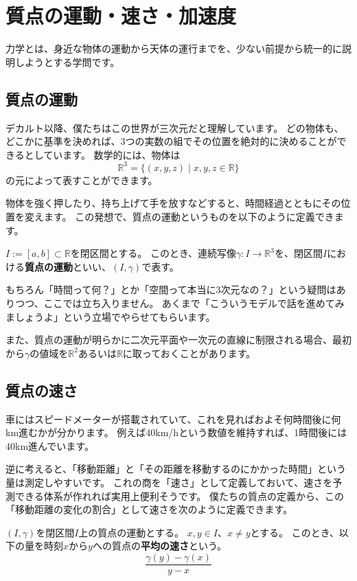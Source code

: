 \chapter{質点の運動・速さ・加速度}

力学とは、身近な物体の運動から天体の運行までを、少ない前提から統一的に説明しようとする学問です。

\section{質点の運動}

デカルト以降、僕たちはこの世界が三次元だと理解しています。
どの物体も、どこかに基準を決めれば、3つの実数の組でその位置を絶対的に決めることができるとしています。
数学的には、物体は
\[
  \mathbb{R}^3=\{(x,y,z)\mid x,y,z\in\mathbb{R}\}
\]
の元によって表すことができます。

物体を強く押したり、持ち上げて手を放すなどすると、時間経過とともにその位置を変えます。
この発想で、質点の運動というものを以下のように定義できます。
\begin{definition}
  $I:=[a,b]\subset\mathbb{R}$を閉区間とする。
  このとき、連続写像$\gamma:I\to\mathbb{R}^3$を、閉区間$I$における\textbf{質点の運動}といい、$(I,\gamma)$で表す。
\end{definition}

もちろん「時間って何？」とか「空間って本当に3次元なの？」という疑問はありつつ、ここでは立ち入りません。
あくまで「こういうモデルで話を進めてみましょうよ」という立場でやらせてもらいます。

また、質点の運動が明らかに二次元平面や一次元の直線に制限される場合、最初から$\gamma$の値域を$\mathbb{R}^2$あるいは$\mathbb{R}$に取っておくことがあります。



\section{質点の速さ}

車にはスピードメーターが搭載されていて、これを見ればおよそ何時間後に何km進むかが分かります。
例えば40km/hという数値を維持すれば、1時間後には40km進んでいます。

逆に考えると、「移動距離」と「その距離を移動するのにかかった時間」という量は測定しやすいです。
これの商を「速さ」として定義しておいて、速さを予測できる体系が作れれば実用上便利そうです。
僕たちの質点の定義から、この「移動距離の変化の割合」として速さを次のように定義できます。
\begin{definition}
  $(I,\gamma)$を閉区間$I$上の質点の運動とする。
  $x,y\in I$、$x\neq y$とする。
  このとき、以下の量を時刻$x$から$y$への質点の\textbf{平均の速さ}という。
  \[
    \frac{\gamma(y)-\gamma(x)}{y-x}
  \]
\end{definition}

